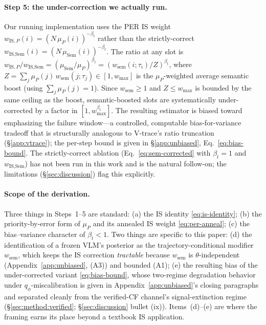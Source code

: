 \paragraph{Step 5: the under-correction we actually run.}
Our running implementation uses the PER IS weight
$w_{\text{IS},P}(i)\!=\!(N\,\mu_P(i))^{-\beta_t}$ rather than the
strictly-correct $w_{\text{IS},\text{Sem}}(i)\!=\!(N\,\mu_{\text{Sem}}(i))^{-\beta_t}$.
The ratio at any slot is
$w_{\text{IS},P}/w_{\text{IS},\text{Sem}}=(\mu_{\text{Sem}}/\mu_P)^{\beta_t}
=(w_{\text{sem}}(i;\tau_i)/Z)^{\beta_t}$, where
$Z=\sum_j \mu_P(j)\,w_{\text{sem}}(j;\tau_j)\!\in\![1,w_{\max}]$ is the
$\mu_P$-weighted average semantic boost (using $\sum_j\mu_P(j)\!=\!1$).
Since $w_{\text{sem}}\!\ge\!1$ and $Z\!\le\!w_{\max}$ is bounded by the
same ceiling as the boost, semantic-boosted slots are systematically
under-corrected by a factor in $[1, w_{\max}^{\beta_t}]$.
The resulting estimator is biased toward emphasizing the failure
window---a controlled, computable bias-for-variance tradeoff that is
structurally analogous to V-trace's ratio truncation
(\S\ref{app:vtrace}); the per-step bound is given in
\S\ref{app:unbiased}, Eq.~\eqref{eq:bias-bound}. The
strictly-correct ablation (Eq.~\eqref{eq:sem-corrected} with
$\beta_t\!=\!1$ and $w_{\text{IS},\text{Sem}}$) has not been run
in this work and is the natural follow-on; the limitations
(\S\ref{sec:discussion}) flag this explicitly.

\paragraph{Scope of the derivation.}
Three things in Steps~1--5 are standard: (a) the IS identity
\eqref{eq:is-identity}; (b) the priority-by-error form of $\mu_P$ and
its annealed IS weight \eqref{eq:per-anneal}; (c) the bias--variance
character of $\beta_t\!<\!1$. Two things are specific to this paper:
(d) the identification of a frozen VLM's posterior as the
trajectory-conditional modifier $w_{\text{sem}}$, which keeps the
IS correction \emph{tractable} because $w_{\text{sem}}$ is
$\theta$-independent (Appendix~\ref{app:unbiased}, (A3)) and bounded
(A1); (e) the resulting bias of the under-corrected variant
\eqref{eq:bias-bound}, whose two-regime degradation behavior under
$q_\phi$-miscalibration is given in
Appendix~\ref{app:unbiased}'s closing paragraphs and separated cleanly
from the verified-CF channel's signal-extinction regime
(\S\ref{sec:method:verified}; \S\ref{sec:discussion} bullet (ix)).
Items~(d)--(e) are where the framing earns its place beyond a textbook
IS application.

